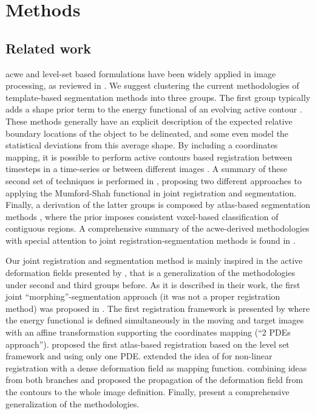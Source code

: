 \section{Methods}
\label{sec:methods}
%
\subsection{Related work}
\label{sec:methods_background}

\Gls{acwe} and level-set based formulations have been widely applied in image
processing, as reviewed in \citep{suri_shape_2002}. We suggest clustering the 
current methodologies of template-based segmentation methods into three groups. 
The first group typically adds a shape prior term to the energy functional of 
an evolving active contour \citep{bresson_variational_2006,
chan_level_2005,chen_using_2002,cremers_kernel_2006,gastaud_combining_2004}.
These methods generally have an explicit description of the expected relative boundary 
locations of the object to be delineated, and some even model the statistical deviations
from this average shape. By including a coordinates mapping, it is possible to perform
active contours based registration between timesteps in a time-series or between different
images \citep{bertalmio_morphing_2000,wyatt_map_2003,paragios_level_2003,vemuri_joint_2003,
yezzi_variational_2003}.
A summary of these second set of techniques is performed in \citep{droske_mumfordshah_2009},
proposing two different approaches to applying the Mumford-Shah \citep{mumford_optimal_1989}
functional in joint registration and segmentation. Finally, a derivation of the 
latter groups is composed by atlas-based segmentation methods 
\citep{gorthi_segmentation_2009,gorthi_active_2011,pohl_unifying_2005,
pohl_bayesian_2006,wang_joint_2006}, where the prior 
imposes consistent voxel-based classification of contiguous regions.
A comprehensive summary of the \gls{acwe}-derived methodologies with special attention
to joint registration-segmentation methods is found in \citep{gorthi_active_2011}.

Our joint registration and segmentation method is mainly inspired in the active
deformation fields presented by \citep{gorthi_active_2011}, that is a generalization
of the methodologies under second and third groups before. As it is described in
their work, the first joint ``morphing''-segmentation approach (it was not a proper
registration method) was proposed in \citep{bertalmio_morphing_2000}. The first
registration framework is presented by \citep{yezzi_variational_2001} where the
energy functional is defined simultaneously in the moving and target images with
an affine transformation supporting the coordinates mapping (``2 PDEs approach'').
\citep{vemuri_joint_2003} proposed the first atlas-based registration based on the 
level set framework and using only one PDE. \citep{unal_coupled_2005} extended the 
idea of \citep{bertalmio_morphing_2000,yezzi_variational_2001} for non-linear 
registration with a dense deformation field as mapping function. \citep{droske_mumfordshah_2009}
combining ideas from both branches and proposed the propagation of the 
deformation field from the contours to the whole image definition. Finally,
\citep{gorthi_active_2011} present a comprehensive generalization of the methodologies.

